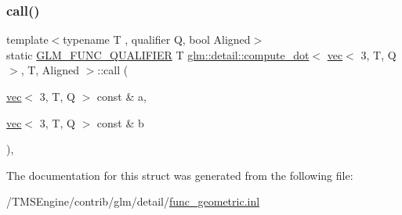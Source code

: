 \subsubsection{\texorpdfstring{call()}{call()}}
{\footnotesize\ttfamily template$<$typename T , qualifier Q, bool Aligned$>$ \\
static \hyperlink{setup_8hpp_a33fdea6f91c5f834105f7415e2a64407}{G\+L\+M\+\_\+\+F\+U\+N\+C\+\_\+\+Q\+U\+A\+L\+I\+F\+I\+ER} T \hyperlink{structglm_1_1detail_1_1compute__dot}{glm\+::detail\+::compute\+\_\+dot}$<$ \hyperlink{structglm_1_1vec}{vec}$<$ 3, T, Q $>$, T, Aligned $>$\+::call (\begin{DoxyParamCaption}\item[{\hyperlink{structglm_1_1vec}{vec}$<$ 3, T, Q $>$ const \&}]{a,  }\item[{\hyperlink{structglm_1_1vec}{vec}$<$ 3, T, Q $>$ const \&}]{b }\end{DoxyParamCaption})\hspace{0.3cm}{\ttfamily [inline]}, {\ttfamily [static]}}



The documentation for this struct was generated from the following file\+:\begin{DoxyCompactItemize}
\item 
/\+T\+M\+S\+Engine/contrib/glm/detail/\hyperlink{func__geometric_8inl}{func\+\_\+geometric.\+inl}\end{DoxyCompactItemize}
